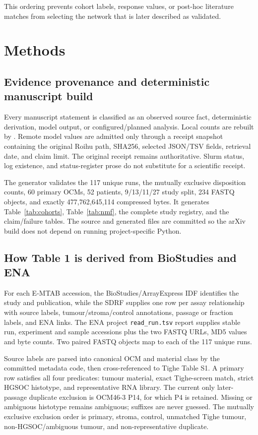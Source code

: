 \documentclass[10pt]{article}
\begin{document}
This ordering prevents cohort labels, response values, or post-hoc literature
matches from selecting the network that is later described as validated.

\section{Methods}

\subsection{Evidence provenance and deterministic manuscript build}

Every manuscript statement is classified as an observed source fact,
deterministic derivation, model output, or configured/planned analysis.  Local
counts are rebuilt by .  Remote model
values are admitted only through a receipt snapshot containing the original
Roihu path, SHA256, selected JSON/TSV fields, retrieval date, and claim limit.
The original receipt remains authoritative.  Slurm status, log existence, and
status-register prose do not substitute for a scientific receipt.

The generator validates the 117 unique runs, the mutually exclusive disposition
counts, 60 primary OCMs, 52 patients, 9/13/11/27 study split, 234 FASTQ objects,
and exactly 477,762,645,114 compressed bytes.  It generates Table~\ref{tab:cohorts},
Table~\ref{tab:nmf}, the complete study registry, and the claim/failure tables.
The source and generated files are committed so the arXiv build does not depend
on running project-specific Python.

\subsection{How Table 1 is derived from BioStudies and ENA}

For each E-MTAB accession, the BioStudies/ArrayExpress IDF identifies the study
and publication, while the SDRF supplies one row per assay relationship with
source labels, tumour/stroma/control annotations, passage or fraction labels,
and ENA links.  The ENA project \texttt{read\_run.tsv} report supplies stable
run, experiment and sample accessions plus the two FASTQ URLs, MD5 values and
byte counts.  Two paired FASTQ objects map to each of the 117 unique runs.

Source labels are parsed into canonical OCM and material class by the committed
metadata code, then cross-referenced to Tighe Table S1.  A primary row satisfies
all four predicates: tumour material, exact Tighe-screen match, strict HGSOC
histotype, and representative RNA library.  The current only later-passage
duplicate exclusion is OCM46-3 P14, for which P4 is retained.  Missing or
ambiguous histotype remains ambiguous; suffixes are never guessed.  The
mutually exclusive exclusion order is primary, stroma, control, unmatched
Tighe tumour, non-HGSOC/ambiguous tumour, and non-representative duplicate.
\end{document}
